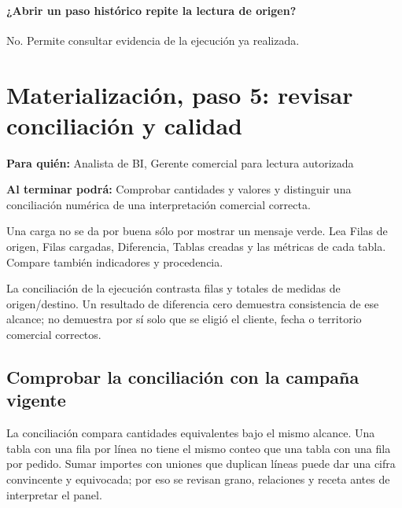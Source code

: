 \paragraph{¿Abrir un paso histórico repite la lectura de origen?} No. Permite consultar evidencia de la ejecución ya realizada.


\begingroup
\setlength{\parskip}{4pt plus 1pt minus 1pt}
\titlespacing*{\paragraph}{0pt}{4pt}{0.5em}
\section{Materialización, paso 5: revisar conciliación y calidad}
\label{unidad:ETL05}
\textbf{Para quién:} Analista de BI, Gerente comercial para lectura autorizada\par
\textbf{Al terminar podrá:} Comprobar cantidades y valores y distinguir una conciliación numérica de una interpretación comercial correcta.

Una carga no se da por buena sólo por mostrar un mensaje verde. Lea Filas de origen, Filas cargadas, Diferencia, Tablas creadas y las métricas de cada tabla. Compare también indicadores y procedencia.

La conciliación de la ejecución contrasta filas y totales de medidas de origen/destino. Un resultado de diferencia cero demuestra consistencia de ese alcance; no demuestra por sí solo que se eligió el cliente, fecha o territorio comercial correctos.

\subsection{Comprobar la conciliación con la campaña vigente}
La conciliación compara cantidades equivalentes bajo el mismo alcance. Una tabla con una fila por línea no tiene el mismo conteo que una tabla con una fila por pedido. Sumar importes con uniones que duplican líneas puede dar una cifra convincente y equivocada; por eso se revisan grano, relaciones y receta antes de interpretar el panel.

